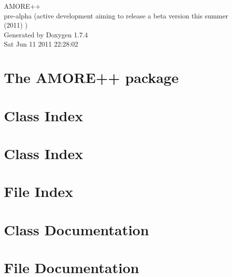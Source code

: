 \documentclass[a4paper]{book}
\begin{document}
\hypersetup{pageanchor=false}
\begin{titlepage}
\vspace*{7cm}
\begin{center}
{\Large AMORE++ \\[1ex]\large pre-\/alpha (active development aiming to release a beta version this summer (2011) ) }\\
\vspace*{1cm}
{\large Generated by Doxygen 1.7.4}\\
\vspace*{0.5cm}
{\small Sat Jun 11 2011 22:28:02}\\
\end{center}
\end{titlepage}
\clearemptydoublepage
{}
\tableofcontents
\clearemptydoublepage
{}
\hypersetup{pageanchor=true}
\chapter{The AMORE++ package}
\label{index}\hypertarget{index}{}
\chapter{Class Index}

\chapter{Class Index}

\chapter{File Index}

\chapter{Class Documentation}













\chapter{File Documentation}



















\printindex
\end{document}
